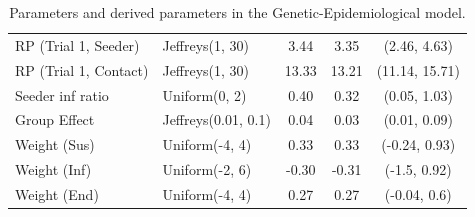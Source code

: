 \begin{table}[!htpb]
\begin{tabular}{llS[table-format=3.2]S[table-format=3.2]c}
  RP (Trial 1, Seeder) & Jeffreys(1, 30) & 3.44 & 3.35 & (2.46, 4.63) \\ 
  RP (Trial 1, Contact) & Jeffreys(1, 30) & 13.33 & 13.21 & (11.14, 15.71) \\ 
  Seeder inf ratio & Uniform(0, 2) & 0.40 & 0.32 & (0.05, 1.03) \\ 
  Group Effect & Jeffreys(0.01, 0.1) & 0.04 & 0.03 & (0.01, 0.09) \\ 
  Weight (Sus) & Uniform(-4, 4) & 0.33 & 0.33 & (-0.24, 0.93) \\ 
  Weight (Inf) & Uniform(-2, 6) & -0.30 & -0.31 & (-1.5, 0.92) \\ 
  Weight (End) & Uniform(-4, 4) & 0.27 & 0.27 & (-0.04, 0.6) \\ 
   \bottomrule
\end{tabular}
\caption{Parameters and derived parameters in the Genetic-Epidemiological model.} 
\end{table}

